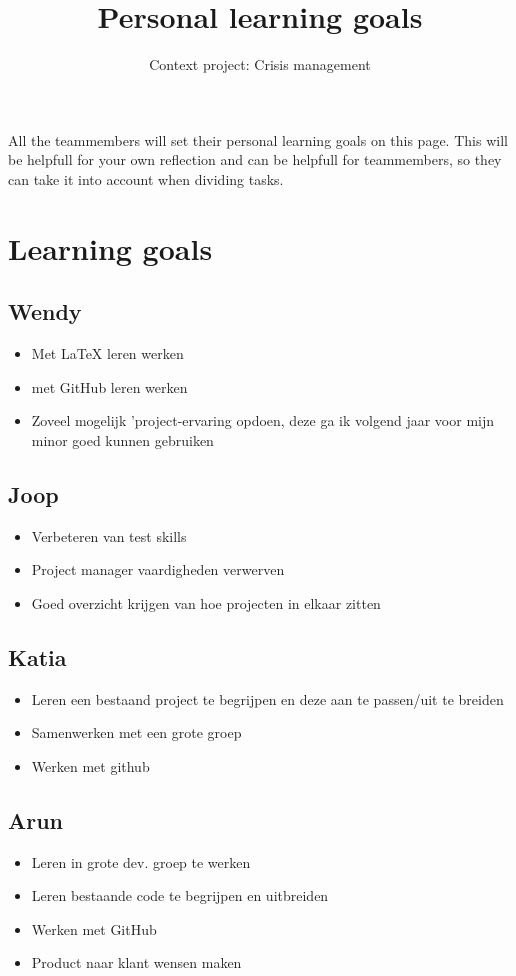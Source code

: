 \documentclass{article}
\begin{document}
\title{Personal learning goals}
\author{Context project: Crisis management}

\maketitle

All the teammembers will set their personal learning goals on this page. This will be helpfull for your own reflection and can be helpfull for teammembers, so they can take it into account when dividing tasks. 
\section*{Learning goals} 

\subsection*{Wendy}
\begin{itemize}
	\item Met \LaTeX{}  leren werken
	\item met GitHub leren werken
	\item Zoveel mogelijk 'project-ervaring opdoen, deze ga ik volgend jaar voor mijn minor goed kunnen gebruiken 
\end{itemize}

\subsection*{Joop}
\begin{itemize}
	\item Verbeteren van test skills
	\item Project manager vaardigheden verwerven
	\item Goed overzicht krijgen van hoe projecten in elkaar zitten
\end{itemize}
\subsection*{Katia}
\begin{itemize}
	\item Leren een bestaand project te begrijpen en deze aan te passen/uit te breiden
	\item Samenwerken met een grote groep
	\item Werken met github
\end{itemize}

\subsection*{Arun}
\begin{itemize}
  \item Leren in grote dev. groep te werken
  \item Leren bestaande code te begrijpen en uitbreiden
  \item Werken met GitHub
  \item Product naar klant wensen maken 
\end{itemize}
\end{document}
